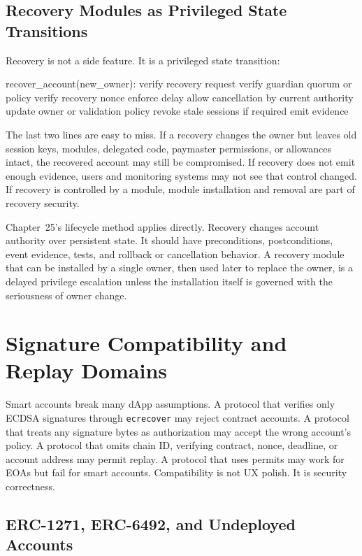 \subsection{Recovery Modules as Privileged State Transitions}

Recovery is not a side feature. It is a privileged state transition:

\begin{codeblock}
recover_account(new_owner):
    verify recovery request
    verify guardian quorum or policy
    verify recovery nonce
    enforce delay
    allow cancellation by current authority
    update owner or validation policy
    revoke stale sessions if required
    emit evidence
\end{codeblock}

The last two lines are easy to miss. If a recovery changes the owner but leaves old session keys, modules, delegated code, paymaster permissions, or allowances intact, the recovered account may still be compromised. If recovery does not emit enough evidence, users and monitoring systems may not see that control changed. If recovery is controlled by a module, module installation and removal are part of recovery security.

Chapter~25's lifecycle method applies directly. Recovery changes account authority over persistent state. It should have preconditions, postconditions, event evidence, tests, and rollback or cancellation behavior. A recovery module that can be installed by a single owner, then used later to replace the owner, is a delayed privilege escalation unless the installation itself is governed with the seriousness of owner change.

\section{Signature Compatibility and Replay Domains}

Smart accounts break many dApp assumptions. A protocol that verifies only ECDSA signatures through \texttt{ecrecover} may reject contract accounts. A protocol that treats any signature bytes as authorization may accept the wrong account's policy. A protocol that omits chain ID, verifying contract, nonce, deadline, or account address may permit replay. A protocol that uses permits may work for EOAs but fail for smart accounts. Compatibility is not UX polish. It is security correctness.

\subsection{ERC-1271, ERC-6492, and Undeployed Accounts}

